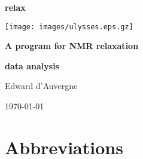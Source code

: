 \documentclass[a4paper, 11pt, twoside, openright]{book}
\begin{document}
\frontmatter



\begin{titlepage}
\begin{center}


{\Huge \textbf{relax}}

{\LARGE \textbf{}}

\centerline{\texttt{[image: images/ulysses.eps.gz]}}

{\huge \textbf{A program for NMR relaxation}}

{\huge \textbf{data analysis}}

{\Large Edward d'Auvergne}

{\large \today}

\end{center}
\end{titlepage}



\tableofcontents



\listoffigures






\chapter*{Abbreviations}
\end{document}
